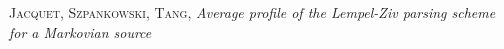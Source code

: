 
\versionAuteur

\def\changemargin#1#2{\list{}{\rightmargin#2\leftmargin#1}\item[]}
\let\endchangemargin=\endlist 
\usepackage{booktabs}
\usepackage{pdfpages}
\setlength{\parindent}{0cm}

\DeclareRobustCommand{\rchi}{{\mathpalette\irchi\relax}}
\newcommand{\irchi}[2]{\raisebox{\depth}{$#1\chi$}}

\usepackage{pdfpages}
\usepackage{hyperref}

\newcommand{\poo}{{p_{0 0}}^{-s}}
\newcommand{\pii}{{p_{1 1}}^{-s}}
\newcommand{\poi}{{p_{0 1}}^{-s}}
\newcommand{\pio}{{p_{1 0}}^{-s}}
\newcommand{\poiio}{{(p_{0 1}\,p_{1 0})}^{-s}}
\newcommand{\pooii}{{(p_{0 0}\,p_{1 1})}^{-s}}





% 
% 


\begin{thebibliography}{9}

        \textsc{Jacquet}, \textsc{Szpankowski}, \textsc{Tang},
        \textit{Average profile of the Lempel-Ziv parsing scheme for a Markovian source}

\end{thebibliography}


